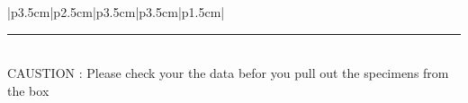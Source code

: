 \documentclass{article}
\newcommand*{\Data}[1]{%
  
    #1\\ 
    \hline
}%
\begin{document}
\begin{MyTabularX}{|p{3.5cm}|p{2.5cm}|p{3.5cm}|p{3.5cm}|p{1.5cm}|}


\end{MyTabularX}

\textcolor{black}{\rule{17cm}{1mm}} \\
CAUSTION : Please check your the data befor you pull out the specimens from the box
\end{document}
